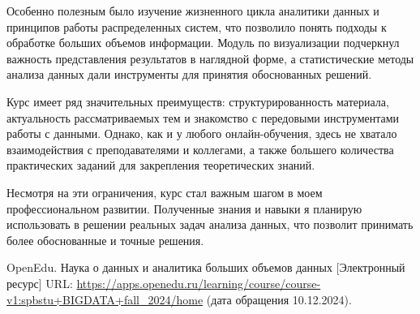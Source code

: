 \documentclass[a4paper, final]{article}
\begin{document}
Особенно полезным было изучение жизненного цикла аналитики данных и принципов работы распределенных систем, что позволило понять подходы к обработке больших объемов информации. Модуль по визуализации подчеркнул важность представления результатов в наглядной форме, а статистические методы анализа данных дали инструменты для принятия обоснованных решений.

Курс имеет ряд значительных преимуществ: структурированность материала, актуальность рассматриваемых тем и знакомство с передовыми инструментами работы с данными. Однако, как и у любого онлайн-обучения, здесь не хватало взаимодействия с преподавателями и коллегами, а также большего количества практических заданий для закрепления теоретических знаний.

Несмотря на эти ограничения, курс стал важным шагом в моем профессиональном развитии. Полученные знания и навыки я планирую использовать в решении реальных задач анализа данных, что позволит принимать более обоснованные и точные решения.
\cleardoublepage
{}
\newpage
\begin{thebibliography}{0}
	OpenEdu. Наука о данных и аналитика больших объемов данных [Электронный ресурс] URL: \url{https://apps.openedu.ru/learning/course/course-v1:spbstu+BIGDATA+fall_2024/home} (дата обращения 10.12.2024).
\end{thebibliography}
\end{document}
